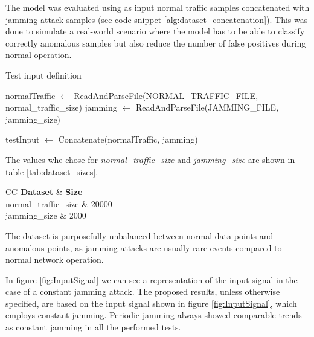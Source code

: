 \documentclass[futureinternet,article,submit,pdftex,moreauthors]{Definitions/mdpi}
\begin{document}
The model was evaluated using as input normal traffic samples concatenated with jamming attack samples (see code snippet \ref{alg:dataset_concatenation}). 
This was done to simulate a real-world scenario where the model has to be able to classify correctly anomalous samples but also reduce the number of false positives during normal operation. 

\begin{algorithm}
	\caption{Test input definition}\label{alg:dataset_concatenation}
	\begin{algorithmic}[1]
	\State normalTraffic $\gets$ ReadAndParseFile(NORMAL\_TRAFFIC\_FILE, normal\_traffic\_size)
	\State jamming $\gets$ ReadAndParseFile(JAMMING\_FILE, jamming\_size)

	\State testInput $\gets$ Concatenate(normalTraffic, jamming)
	\end{algorithmic}
\end{algorithm}

The values whe chose for \textit{normal\_traffic\_size} and \textit{jamming\_size} are shown in table \ref{tab:dataset_sizes}. 

\begin{table}[H]
	\caption{Dataset sizes used for the tuning and testing phases.}\label{tab:dataset_sizes}
	\begin{tabularx}{\textwidth}{CC}
	\toprule
	\textbf{Dataset} & \textbf{Size} \\
	\midrule
	normal\_traffic\_size & 20000 \\
	jamming\_size & 2000 \\
	\bottomrule
\end{tabularx}
\end{table}

The dataset is purposefully unbalanced between normal data points and anomalous points, as jamming attacks are usually rare events compared to normal network operation. 

In figure \ref{fig:InputSignal} we can see a representation of the input signal in the case of a constant jamming attack. The proposed results, unless otherwise specified, are based on the input signal shown in figure \ref{fig:InputSignal}, which employs constant jamming. Periodic jamming always showed comparable trends as constant jamming in all the performed tests.
\end{document}

